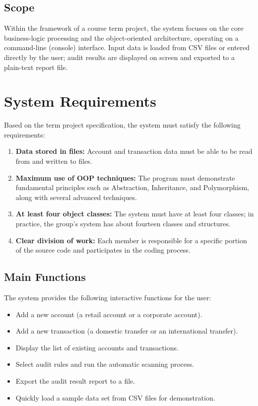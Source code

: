     \subsection{Scope}
    Within the framework of a course term project, the system focuses on the core business-logic processing and the object-oriented architecture, operating on a command-line (console) interface. Input data is loaded from CSV files or entered directly by the user; audit results are displayed on screen and exported to a plain-text report file.

\section{System Requirements}
    Based on the term project specification, the system must satisfy the following requirements:

    \begin{enumerate}
        \item \textbf{Data stored in files:} Account and transaction data must be able to be read from and written to files.
        \item \textbf{Maximum use of OOP techniques:} The program must demonstrate fundamental principles such as Abstraction, Inheritance, and Polymorphism, along with several advanced techniques.
        \item \textbf{At least four object classes:} The system must have at least four classes; in practice, the group's system has about fourteen classes and structures.
        \item \textbf{Clear division of work:} Each member is responsible for a specific portion of the source code and participates in the coding process.
    \end{enumerate}

    \subsection{Main Functions}
    The system provides the following interactive functions for the user:
    \begin{itemize}
        \item Add a new account (a retail account or a corporate account).
        \item Add a new transaction (a domestic transfer or an international transfer).
        \item Display the list of existing accounts and transactions.
        \item Select audit rules and run the automatic scanning process.
        \item Export the audit result report to a file.
        \item Quickly load a sample data set from CSV files for demonstration.
    \end{itemize}

